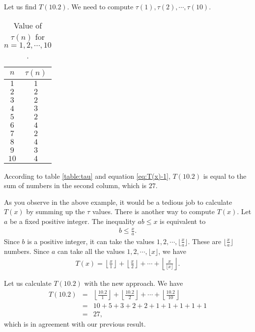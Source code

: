 \documentclass[12pt]{subfile}
\begin{document}
	\begin{example}
		Let us find $T(10.2)$. We need to compute $\tau(1), \tau(2), \cdots, \tau(10)$.
			\begin{table}
					\begin{center}
						\begin{tabular}{|c|c|}
							\hline
							$n$ & $\tau(n)$\\
							\hline
							$1$ & $1$\\
							\hline
							$2$ & $2$\\
							\hline
							$3$ & $2$\\
							\hline
							$4$ & $3$\\
							\hline
							$5$ & $2$\\
							\hline
							$6$ & $4$\\
							\hline
							$7$ & $2$\\
							\hline
							$8$ & $4$\\
							\hline
							$9$ & $3$\\
							\hline
							$10$ & $4$\\
							\hline
					\end{tabular}
					\caption{Value of $\tau(n)$ for $n=1,2,\cdots,10$.}\label{table:tau}
				\end{center}
			\end{table}
		According to table \eqref{table:tau} and equation \eqref{eq:T(x)-1}, $T(10.2)$ is equal to the sum of numbers in the second column, which is $27$.
	\end{example}


As you observe in the above example, it would be a tedious job to calculate $T(x)$ by summing up the $\tau$ values. There is another way to compute $T(x)$. Let $a$ be a fixed positive integer. The inequality $ab \leq x$ is equivalent to
	\begin{align*}
		b \leq \frac{x}{a}.
	\end{align*}
Since $b$ is a positive integer, it can take the values $1, 2, \cdots, \lfloor \frac{x}{a}\rfloor$. These are $\lfloor \frac{x}{a}\rfloor$ numbers. Since $a$ can take all the values $1, 2, \cdots, \lfloor x \rfloor$, we have
	\begin{align*}
		T(x) = \left\lfloor \frac{x}{1}\right\rfloor + \left\lfloor \frac{x}{2}\right\rfloor + \cdots + \left\lfloor \frac{x}{\lfloor x \rfloor}\right\rfloor.
	\end{align*}

	\begin{example}
		Let us calculate $T(10.2)$ with the new approach. We have
			\begin{eqnarray*}
				T(10.2) &=& \left\lfloor \frac{10.2}{1}\right\rfloor + \left\lfloor \frac{10.2}{2}\right\rfloor + \cdots + \left\lfloor \frac{10.2}{10}\right\rfloor\\
						&=& 10 + 5 + 3 + 2 + 2 + 1 + 1 + 1 + 1 + 1\\
						&=& 27,
			\end{eqnarray*}
		which is in agreement with our previous result.
	\end{example}
\end{document}
